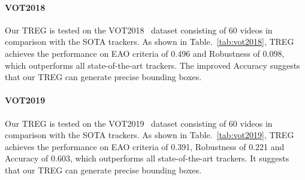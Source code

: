 \documentclass[10pt,twocolumn,letterpaper]{article}
\begin{document}
\paragraph{VOT2018}
Our TREG is tested on the VOT2018~\cite{vot2018} dataset consisting of 60 videos in comparison with the SOTA trackers.
As shown in Table.~\ref{tab:vot2018}, TREG achieves the performance on EAO criteria of 0.496 and Robustness of 0.098, which outperforms all state-of-the-art trackers. The improved Accuracy suggests that our TREG can generate precise bounding boxes.

\paragraph{VOT2019}

Our TREG is tested on the VOT2019~\cite{vot2019} dataset consisting of 60 videos in comparison with the SOTA trackers.
As shown in Table.~\ref{tab:vot2019}, TREG achieves the performance on EAO criteria of 0.391, Robustness of 0.221 and Accuracy of 0.603, which outperforms all state-of-the-art trackers. It suggests that our TREG can generate precise bounding boxes.



\begin{table}[t]
\begin{center}
\fontsize{7}{9}\selectfont  
{}
\end{center}
\vspace{-0.2cm}
\caption{Comparison with state-of-the-art trackers on VOT2018.} 
\label{tab:vot2018}
\vspace{-0.1cm}
\end{table}
\end{document}
